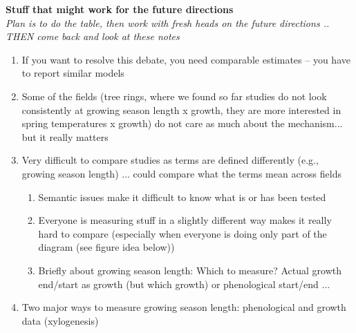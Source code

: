 \documentclass[11pt,letter]{article}
\begin{document}
\newpage
{\bf Stuff that might work for the future directions}\\
\emph{Plan is to do the table, then work with fresh heads on the future directions .. THEN come back and look at these notes}
\begin{enumerate}
\item If you want to resolve this debate, you need comparable estimates -- you have to report similar models %
\item Some of the fields (tree rings, where we found so far studies do not look consistently at growing season length x growth, they are more interested in spring temperatures x growth) do not care as much about the mechanism... but it really matters
\item Very difficult to compare studies as terms are defined differently (e.g., growing season length) ... could compare what the terms mean across fields
\begin{enumerate}
\item Semantic issues make it difficult to know what is or has been tested
\item Everyone is measuring stuff in a slightly different way makes it really hard to compare (especially when everyone is doing only part of the diagram (see figure idea below))
\item Briefly about growing season length: Which to measure? Actual growth end/start as growth (but which growth) or phenological start/end ... 
\end{enumerate}
\item Two major ways to measure growing season length: phenological and growth data (xylogenesis)
\end{enumerate}
\end{document}

